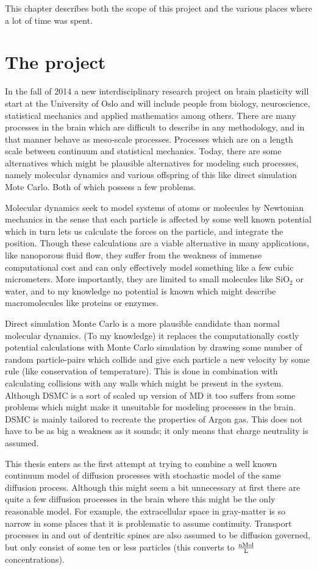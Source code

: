\documentclass[main.tex]{subfiles}
\begin{document}
 This chapter describes both the scope of this project and the various places where a lot of time was spent.

\section{The project}
In the fall of 2014 a new interdisciplinary research project on brain plasticity will start at the University of Oslo and will include people from biology, neuroscience, statistical mechanics and applied mathematics among others. 
There are many processes in the brain which are difficult to describe in any methodology, and in that manner behave as meso-scale processes. 
Processes which are on a length scale between continuum and statistical mechanics. 
Today, there are some alternatives which might be plausible alternatives for modeling such processes, namely molecular dynamics and various offspring of this like direct simulation Mote Carlo. 
Both of which possess a few problems. 

Molecular dynamics seek to model systems of atoms or molecules by Newtonian mechanics in the sense that each particle is affected by some well known potential which in turn lets us calculate the forces on the particle, and integrate the position. 
Though these calculations are a viable alternative in many applications, like nanoporous fluid flow, they suffer from the weakness of immense computational cost and can only effectively model something like a few cubic micrometers. 
More importantly, they are limited to small molecules like SiO$_2$ or water, and to my knowledge no potential is known which might describe macromolecules like proteins or enzymes. 

Direct simulation Monte Carlo is a more plausible candidate than normal molecular dynamics. 
(To my knowledge) it replaces the computationally costly potential calculations with Monte Carlo simulation by drawing some number of random particle-pairs which collide and give each particle a new velocity by some rule (like conservation of temperature). 
This is done in combination with calculating collisions with any walls which might be present in the system. 
Although DSMC is a sort of scaled up version of MD it too suffers from some problems which might make it unsuitable for modeling processes in the brain. 
DSMC is mainly tailored to recreate the properties of Argon gas. This does not have to be as big a weakness as it sounds; it only means that charge neutrality is assumed. 


This thesis enters as the first attempt at trying to combine a well known continuum model of diffusion processes with stochastic model of the same diffusion process. 
Although this might seem a bit unnecessary at first there are quite a few diffusion processes in the brain where this might be the only reasonable model. 
For example, the extracellular space in gray-matter is so narrow in some places that it is problematic to assume continuity. 
Transport processes in and out of dentritic spines are also assumed to be diffusion governed, but only consist of some ten or less particles (this converts to $\frac{\text{nMol}}{\text L}$ concentrations). 
\end{document}
